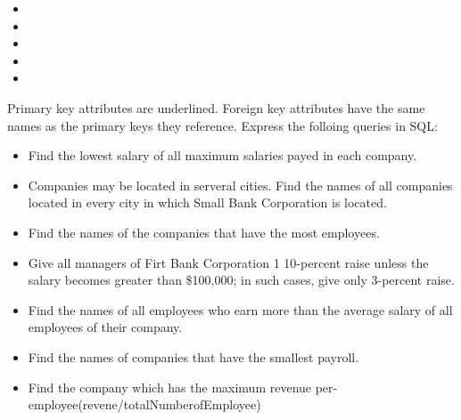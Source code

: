 \documentclass[12pt]{article}
\begin{document}
\begin{itemize}
\item
{}
\item
{}
\item
{}
\item
{}
\item
{}
\end{itemize}
Primary key attributes are underlined. Foreign key attributes have the same names as the primary 
keys they reference. Express the folloing queries in SQL:
\begin{itemize}
\item Find the lowest salary of all maximum salaries payed in each company.
\item Companies may be located in serveral cities. Find the names of all companies located in every
 city in which Small Bank Corporation is located.
\item Find the names of the companies that have the most employees.
\item Give all managers of Firt Bank Corporation 1 10-percent raise unless the salary becomes greater than
 \$100,000; in such cases, give only 3-percent raise.
\item Find the names of all employees who earn more than the average salary of all employees of their company.
\item Find the names of companies that have the smallest payroll.
\item Find the company which has the maximum revenue per-employee(revene/totalNumberofEmployee)

\end{itemize}
\end{document}
